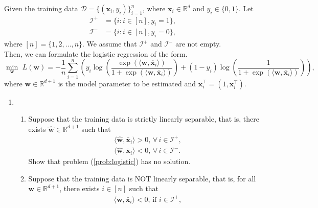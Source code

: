 \documentclass[11pt,letter,notitlepage]{article}
\begin{document}
\begin{solution}

\end{solution}
\newpage
\clearpage


\begin{exercise}
Given the training data $\mathcal{D}=\{ (\textbf{x}_i,y_i) \}_{i=1}^n$, where $\textbf{x}_i \in \mathbb{R}^d$ and $y_i \in \{ 0,1 \}$. Let
\begin{align*}
    \mathcal{I}^+&=\{i:i\in[n],y_i=1\},\\
    \mathcal{I}^-&=\{i:i\in[n],y_i=0\},
\end{align*}
where $[n]=\{1,2,\ldots,n\}$. We assume that $\mathcal{I}^+$ and $\mathcal{I}^-$ are not empty.\\
Then, we can formulate the logistic regression of the form.
	\begin{equation}\label{prob:logistic}
	\min_{\textbf{w}}\,\,L(\textbf{w})=-\frac{1}{n}\sum_{i=1}^n \left( y_i \log \left( \frac{\exp(\langle \textbf{w},  \overline{\mathbf{x}}_i \rangle)}{1+\exp(\langle \textbf{w},  \overline{\mathbf{x}}_i \rangle) } \right) + (1-y_i)\log \left( \frac{1}{1+\exp(\langle \textbf{w},  \overline{\mathbf{x}}_i \rangle)} \right) \right),
	\end{equation}
	where $\mathbf{w} \in \mathbb{R}^{d+1}$ is the model parameter to be estimated and $ \overline{\mathbf{x}}_i^{\top} = (1,\mathbf{x}_i^{\top}) $.
    \begin{enumerate}
        \item
        \begin{enumerate}
            \item Suppose that the training data is strictly linearly separable, that is, there exists $\hat{\mathbf{w}}\in\mathbb{R}^{d+1}$ such that
    	\begin{align*}
    	    &\langle \hat{\mathbf{w}}, \mathbf{\bar{x}}_i\rangle>0,\,\forall\,i\in\mathcal{I}^+,\\
    	    &\langle \hat{\mathbf{w}}, \mathbf{\bar{x}}_i\rangle<0,\,\forall\,i\in\mathcal{I}^-.
    	\end{align*}
    	Show that problem (\ref{prob:logistic}) has no solution.
            \item
            Suppose that the training data is NOT linearly separable, that is, for all $\mathbf{w} \in \mathbb{R}^{d+1}$, there exists $ i \in \left[ n \right] $ such that
            \begin{align*}
    	    &\langle \mathbf{w}, \mathbf{\bar{x}}_i\rangle< 0,\,\text{if\ } i\in\mathcal{I}^+,

\end{align*}
\end{enumerate}
\end{enumerate}
\end{exercise}
\end{document}
